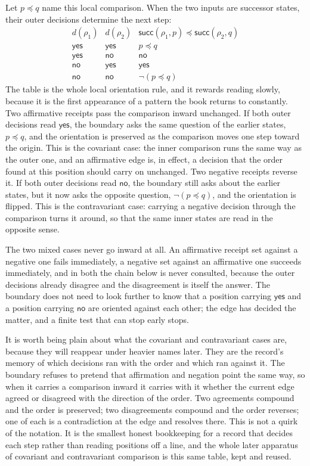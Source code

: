 Let \(p \preceq q\) name this local comparison. When the two inputs are successor states, their outer decisions determine the next step:
\[
\begin{array}{c|c|c}
d(\rho_1) & d(\rho_2) &
\mathsf{succ}(\rho_1,p)\preceq\mathsf{succ}(\rho_2,q) \\
\hline
\mathsf{yes} & \mathsf{yes} & p\preceq q \\
\mathsf{yes} & \mathsf{no}  & \mathsf{no} \\
\mathsf{no}  & \mathsf{yes} & \mathsf{yes} \\
\mathsf{no}  & \mathsf{no}  & \neg(p\preceq q)
\end{array}
\]
The table is the whole local orientation rule, and it rewards reading slowly, because it is the first appearance of a pattern the book returns to constantly. Two affirmative receipts pass the comparison inward unchanged. If both outer decisions read \(\mathsf{yes}\), the boundary asks the same question of the earlier states, \(p \preceq q\), and the orientation is preserved as the comparison moves one step toward the origin. This is the covariant case: the inner comparison runs the same way as the outer one, and an affirmative edge is, in effect, a decision that the order found at this position should carry on unchanged. Two negative receipts reverse it. If both outer decisions read \(\mathsf{no}\), the boundary still asks about the earlier states, but it now asks the opposite question, \(\neg(p \preceq q)\), and the orientation is flipped. This is the contravariant case: carrying a negative decision through the comparison turns it around, so that the same inner states are read in the opposite sense.

The two mixed cases never go inward at all. An affirmative receipt set against a negative one fails immediately, a negative set against an affirmative one succeeds immediately, and in both the chain below is never consulted, because the outer decisions already disagree and the disagreement is itself the answer. The boundary does not need to look further to know that a position carrying \(\mathsf{yes}\) and a position carrying \(\mathsf{no}\) are oriented against each other; the edge has decided the matter, and a finite test that can stop early stops.

It is worth being plain about what the covariant and contravariant cases are, because they will reappear under heavier names later. They are the record's memory of which decisions ran with the order and which ran against it. The boundary refuses to pretend that affirmation and negation point the same way, so when it carries a comparison inward it carries with it whether the current edge agreed or disagreed with the direction of the order. Two agreements compound and the order is preserved; two disagreements compound and the order reverses; one of each is a contradiction at the edge and resolves there. This is not a quirk of the notation. It is the smallest honest bookkeeping for a record that decides each step rather than reading positions off a line, and the whole later apparatus of covariant and contravariant comparison is this same table, kept and reused.

